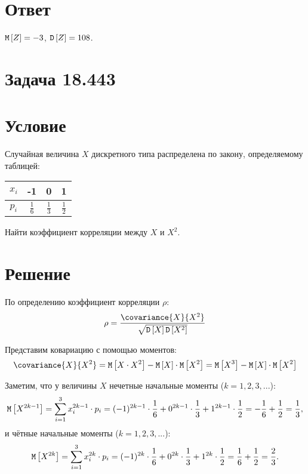 \documentclass[a4paper,12pt]{article}
\begin{document}
    \section*{Ответ}
    $\mathtt{M} \left [ Z \right ] = -3$, $\mathtt{D} \left [ Z \right ] = 108$.


    \section{Задача 18.443}
    \section*{Условие}
    Случайная величина $X$ дискретного типа распределена по закону, определяемому таблицей:

    \begin{tabular}{|c|c|c|c|}
        \hline
        $x_i$ & -1            & 0             & 1             \\
        \hline
        $p_i$ & $\frac{1}{6}$ & $\frac{1}{3}$ & $\frac{1}{2}$ \\
        \hline
    \end{tabular}

    Найти коэффициент корреляции между $X$ и $X^2$.
    \section*{Решение}
    По определению коэффициент корреляции $\rho$:
    \begin{equation}
        \rho = \frac{\covariance{X}{X^2}}{\sqrt{\variance{X} \variance{X^2}}}
    \end{equation}

    Представим ковариацию с помощью моментов:
    \begin{equation}
        \covariance{X}{X^2}
        = \expectation{X \cdot X^2} - \expectation{X} \cdot \expectation{X^2}
        = \expectation{X^3} - \expectation{X} \cdot \expectation{X^2}
    \end{equation}

    Заметим, что у величины $X$ нечетные начальные моменты ($k=1,2,3,...$):
    \begin{equation}
        \mathtt{M} \left [ X^{2k-1} \right ] = \sum_{i=1}^3 x_i^{2k-1} \cdot p_i = (-1)^{2k-1} \cdot \frac{1}{6} + 0^{2k-1} \cdot \frac{1}{3} + 1^{2k-1} \cdot \frac{1}{2} = - \frac{1}{6} + \frac{1}{2} = \frac{1}{3} ,
    \end{equation}
    и чётные начальные моменты ($k=1,2,3,...$):
    \begin{equation}
        \mathtt{M} \left [ X^{2k} \right ] = \sum_{i=1}^3 x_i^{2k} \cdot p_i = (-1)^{2k} \cdot \frac{1}{6} + 0^{2k} \cdot \frac{1}{3} + 1^{2k} \cdot \frac{1}{2} = \frac{1}{6} + \frac{1}{2} = \frac{2}{3} .
    \end{equation}
\end{document}
